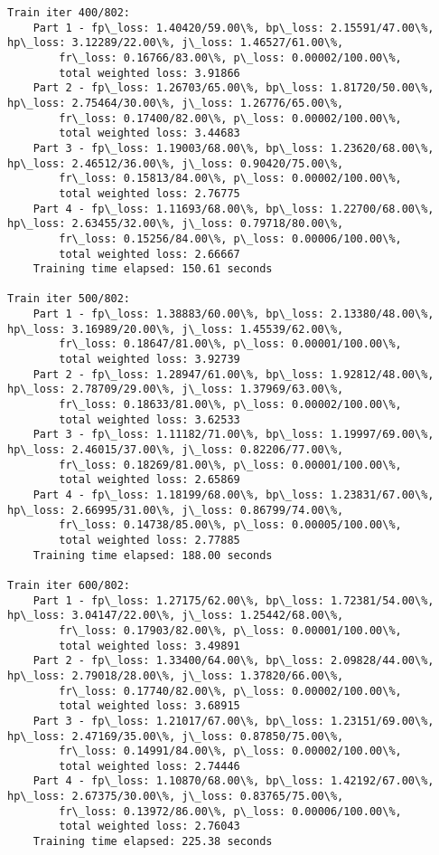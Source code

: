 \documentclass[11pt]{article}
\begin{document}
\begin{Verbatim}[commandchars=\\\{\}]
Train iter 400/802:
	Part 1 - fp\_loss: 1.40420/59.00\%, bp\_loss: 2.15591/47.00\%, hp\_loss: 3.12289/22.00\%, j\_loss: 1.46527/61.00\%, 
		fr\_loss: 0.16766/83.00\%, p\_loss: 0.00002/100.00\%, 
		total weighted loss: 3.91866
	Part 2 - fp\_loss: 1.26703/65.00\%, bp\_loss: 1.81720/50.00\%, hp\_loss: 2.75464/30.00\%, j\_loss: 1.26776/65.00\%, 
		fr\_loss: 0.17400/82.00\%, p\_loss: 0.00002/100.00\%, 
		total weighted loss: 3.44683
	Part 3 - fp\_loss: 1.19003/68.00\%, bp\_loss: 1.23620/68.00\%, hp\_loss: 2.46512/36.00\%, j\_loss: 0.90420/75.00\%, 
		fr\_loss: 0.15813/84.00\%, p\_loss: 0.00002/100.00\%, 
		total weighted loss: 2.76775
	Part 4 - fp\_loss: 1.11693/68.00\%, bp\_loss: 1.22700/68.00\%, hp\_loss: 2.63455/32.00\%, j\_loss: 0.79718/80.00\%, 
		fr\_loss: 0.15256/84.00\%, p\_loss: 0.00006/100.00\%, 
		total weighted loss: 2.66667
	Training time elapsed: 150.61 seconds

Train iter 500/802:
	Part 1 - fp\_loss: 1.38883/60.00\%, bp\_loss: 2.13380/48.00\%, hp\_loss: 3.16989/20.00\%, j\_loss: 1.45539/62.00\%, 
		fr\_loss: 0.18647/81.00\%, p\_loss: 0.00001/100.00\%, 
		total weighted loss: 3.92739
	Part 2 - fp\_loss: 1.28947/61.00\%, bp\_loss: 1.92812/48.00\%, hp\_loss: 2.78709/29.00\%, j\_loss: 1.37969/63.00\%, 
		fr\_loss: 0.18633/81.00\%, p\_loss: 0.00002/100.00\%, 
		total weighted loss: 3.62533
	Part 3 - fp\_loss: 1.11182/71.00\%, bp\_loss: 1.19997/69.00\%, hp\_loss: 2.46015/37.00\%, j\_loss: 0.82206/77.00\%, 
		fr\_loss: 0.18269/81.00\%, p\_loss: 0.00001/100.00\%, 
		total weighted loss: 2.65869
	Part 4 - fp\_loss: 1.18199/68.00\%, bp\_loss: 1.23831/67.00\%, hp\_loss: 2.66995/31.00\%, j\_loss: 0.86799/74.00\%, 
		fr\_loss: 0.14738/85.00\%, p\_loss: 0.00005/100.00\%, 
		total weighted loss: 2.77885
	Training time elapsed: 188.00 seconds

Train iter 600/802:
	Part 1 - fp\_loss: 1.27175/62.00\%, bp\_loss: 1.72381/54.00\%, hp\_loss: 3.04147/22.00\%, j\_loss: 1.25442/68.00\%, 
		fr\_loss: 0.17903/82.00\%, p\_loss: 0.00001/100.00\%, 
		total weighted loss: 3.49891
	Part 2 - fp\_loss: 1.33400/64.00\%, bp\_loss: 2.09828/44.00\%, hp\_loss: 2.79018/28.00\%, j\_loss: 1.37820/66.00\%, 
		fr\_loss: 0.17740/82.00\%, p\_loss: 0.00002/100.00\%, 
		total weighted loss: 3.68915
	Part 3 - fp\_loss: 1.21017/67.00\%, bp\_loss: 1.23151/69.00\%, hp\_loss: 2.47169/35.00\%, j\_loss: 0.87850/75.00\%, 
		fr\_loss: 0.14991/84.00\%, p\_loss: 0.00002/100.00\%, 
		total weighted loss: 2.74446
	Part 4 - fp\_loss: 1.10870/68.00\%, bp\_loss: 1.42192/67.00\%, hp\_loss: 2.67375/30.00\%, j\_loss: 0.83765/75.00\%, 
		fr\_loss: 0.13972/86.00\%, p\_loss: 0.00006/100.00\%, 
		total weighted loss: 2.76043
	Training time elapsed: 225.38 seconds


\end{Verbatim}
\end{document}
